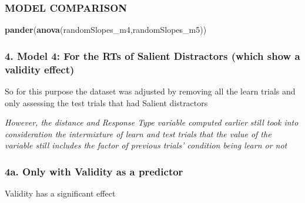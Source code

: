 \documentclass[
]{article}
\newenvironment{Shaded}{\begin{snugshade}}{\end{snugshade}}
\newcommand{\KeywordTok}[1]{\textcolor[rgb]{0.13,0.29,0.53}{\textbf{#1}}}
\newcommand{\NormalTok}[1]{#1}
\begin{document}
\hypertarget{model-comparison}{%
\subsubsection{MODEL COMPARISON}\label{model-comparison}}

\begin{Shaded}
\begin{Highlighting}[]
\KeywordTok{pander}\NormalTok{(}\KeywordTok{anova}\NormalTok{(randomSlopes_m4,randomSlopes_m5))}
\end{Highlighting}
\end{Shaded}

\hypertarget{model-4-for-the-rts-of-salient-distractors-which-show-a-validity-effect}{%
\subsubsection{4. Model 4: For the RTs of Salient Distractors (which
show a validity
effect)}\label{model-4-for-the-rts-of-salient-distractors-which-show-a-validity-effect}}

So for this purpose the dataset was adjusted by removing all the learn
trials and only assessing the test trials that had Salient distractors

\emph{However, the distance and Response Type variable computed earlier
still took into consideration the intermixture of learn and test trials
that the value of the variable still includes the factor of previous
trials' condition being learn or not}

\hypertarget{a.-only-with-validity-as-a-predictor}{%
\subsubsection{4a. Only with Validity as a
predictor}\label{a.-only-with-validity-as-a-predictor}}

Validity has a significant effect
\end{document}

